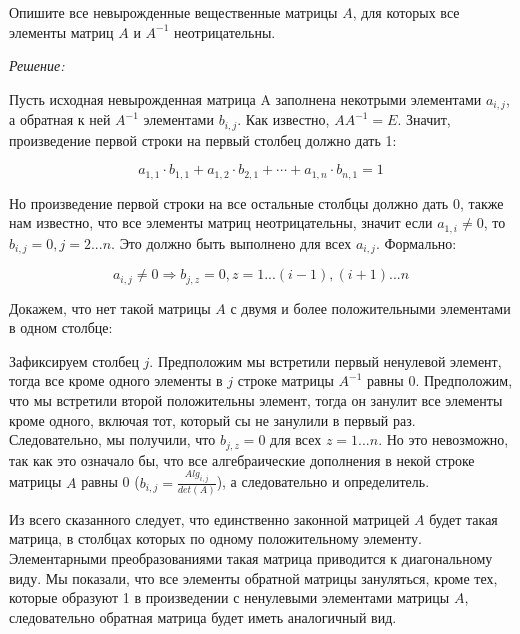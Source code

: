 \documentclass[10pt]{article}
\begin{document}
Опишите все невырожденные вещественные матрицы $A$, для которых все элементы матриц $A$ и $A^{-1}$ неотрицательны.

\textit{Решение:}

Пусть исходная невырожденная матрица A заполнена некотрыми элементами $a_{i,j}$, а обратная к ней $A^{-1}$ элементами $b_{i, j}$. Как известно, $AA^{-1} = E$. Значит, произведение первой строки на первый столбец должно дать 1:

\[
a_{1,1}\cdot b_{1,1} + a_{1,2}\cdot b_{2,1} + \cdots + a_{1,n}\cdot b_{n,1} = 1 
\]

Но произведение первой строки на все остальные столбцы должно дать 0, также нам известно, что все элементы матриц неотрицательны, значит если $a_{1,i} \neq 0$, то $b_{i,j} = 0, j = 2...n$. Это должно быть выполнено для всех $a_{i,j}$. Формально: 

\[a_{i,j} \neq 0 \Rightarrow b_{j,z} = 0, z = 1...(i-1),(i+1)...n\]

 
 Докажем, что нет такой матрицы $A$ с двумя и более положительными элементами в одном столбце:
 
 \vspace{2mm}
 
 Зафиксируем столбец $j$. Предположим мы встретили первый ненулевой элемент, тогда все кроме одного элементы в $j$ строке матрицы $A^{-1}$ равны 0. Предположим, что мы встретили второй положительны элемент, тогда он занулит все элементы кроме одного, включая тот, который сы не занулили в первый раз. Следовательно, мы получили, что $b_{j,z} = 0$ для всех $z = 1...n$.
 Но это невозможно, так как это означало бы, что все алгебраические дополнения в некой строке матрицы $A$ равны 0 ($b_{i,j} = \frac{Alg_{i,j}}{det(A)}$), а следовательно и определитель. 

Из всего сказанного следует, что единственно законной матрицей $A$ будет такая матрица, в столбцах которых по одному положительному элементу. Элементарными преобразованиями такая матрица приводится к диагональному виду. Мы показали, что все элементы обратной матрицы зануляться, кроме тех, которые образуют 1 в произведении с ненулевыми элементами матрицы $A$, следовательно обратная матрица будет иметь аналогичный вид. 
\end{document}
